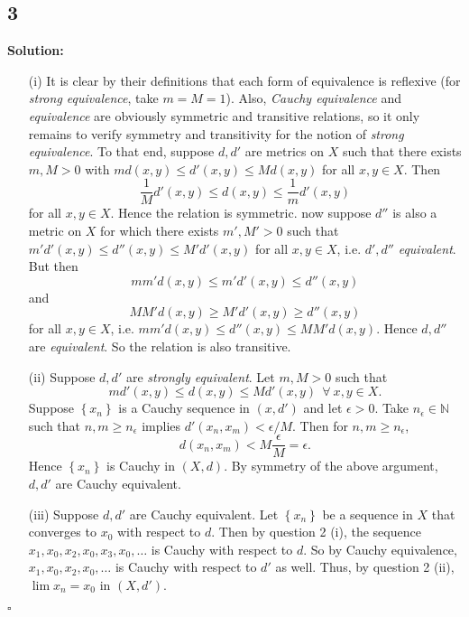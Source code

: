 \documentclass[12pt]{article}
\newcounter{ProofCounter}
\newenvironment{Solution}{\stepcounter{ProofCounter}\textbf{Solution:}}{\hfill$\square$}
\begin{document}
\subsection*{3}
\begin{Solution}
  \begin{enumerate}
    \item[(i)] It is clear by their definitions that each form of equivalence is reflexive (for \emph{strong equivalence}, take $m = M = 1$).
      Also, \emph{Cauchy equivalence} and \emph{equivalence} are obviously symmetric and transitive relations, so it only remains to verify symmetry
      and transitivity for the notion of \emph{strong equivalence}. To that end, suppose $d, d'$ are metrics on $X$ such that there exists $m, M > 0$
      with $md(x,y) \leq d'(x,y) \leq Md(x,y)$ for all $x,y \in X$. Then 
      \[
        \frac{1}{M} d'(x,y) \leq d(x,y) \leq \frac{1}{m}d'(x,y)
      \]
      for all $x,y \in X$. Hence the relation is symmetric. now suppose $d''$ is also a metric on $X$ for which there exists $m', M' > 0$ such that 
      $m'd'(x,y) \leq d''(x,y) \leq M'd'(x,y)$ for all $x,y \in X$, i.e. $d', d''$ \emph{equivalent}. But then 
      \[
        mm' d(x,y) \leq m'd'(x,y) \leq d''(x,y) 
      \]
      and 
      \[
        MM'd(x,y) \geq M'd'(x,y) \geq d''(x,y)
      \]
      for all $x,y \in X$, i.e. $mm'd(x,y) \leq d''(x,y) \leq MM'd(x,y)$. Hence $d,d''$ are \emph{equivalent}. So the relation is also transitive.

    \item[(ii)] Suppose $d, d'$ are \emph{strongly equivalent}. Let $m, M > 0$ such that 
      \[
        md'(x,y) \leq d(x,y) \leq Md'(x,y) \ \ \forall \ x,y \in X.
      \]
      Suppose $\left\{ x_n \right\}$ is a Cauchy sequence in $(x,d')$ and let $\epsilon > 0$. Take $n_{\epsilon} \in \mathbb{N}$ such that $n,m \geq
      n_{\epsilon}$ implies $d'(x_n,x_m) < \epsilon / M$. Then for $n,m \geq n_{\epsilon}$,
      \[
        d(x_n,x_m) < M \frac{\epsilon}{M} = \epsilon.
      \]
      Hence $\left\{ x_n \right\}$ is Cauchy in $(X,d)$. By symmetry of the above argument, $d, d'$ are Cauchy equivalent.

    \item[(iii)] Suppose $d,d'$ are Cauchy equivalent. Let $\left\{ x_n \right\}$ be a sequence in $X$ that converges to $x_0$ with respect to $d$.
      Then by question 2 (i), the sequence $x_1, x_0, x_2, x_0, x_3, x_0, \dots$ is Cauchy with respect to $d$.
      So by Cauchy equivalence, $x_1, x_0, x_2, x_0, \dots$ is Cauchy with respect to $d'$ as
      well. Thus, by question 2 (ii), $\lim x_n = x_0$ in $(X, d')$.


\end{enumerate}
\end{Solution}
\end{document}
